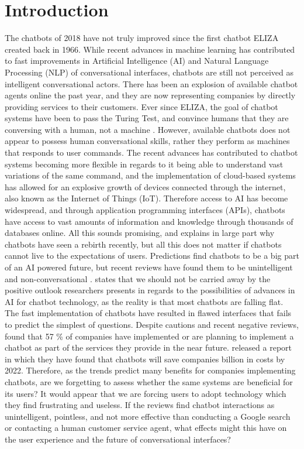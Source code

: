 \chapter{Introduction}
\label{chap:introduction}
The chatbots of 2018 have not truly improved since the first chatbot ELIZA created back in 1966. While recent advances in machine learning has contributed to fast improvements in Artificial Intelligence (AI) and Natural Language Processing (NLP) of conversational interfaces, chatbots are still not perceived as intelligent conversational actors. There has been an explosion of available chatbot agents online the past year, and they are now representing companies by directly providing services to their customers. Ever since ELIZA, the goal of chatbot systems have been to pass the Turing Test, and convince humans that they are conversing with a human, not a machine \citep{McTear2016b}. However, available chatbots does not appear to possess human conversational skills, rather they perform as machines that responds to user commands. The recent advances has contributed to chatbot systems becoming more flexible in regards to it being able to understand vast variations of the same command, and the implementation of cloud-based systems has allowed for an explosive growth of devices connected through the internet, also known as the Internet of Things (IoT). Therefore access to AI has become widespread, and through application programming interfaces (APIs), chatbots have access to vast amounts of information and knowledge through thousands of databases online. All this sounds promising, and explains in large part why chatbots have seen a rebirth recently, but all this does not matter if chatbots cannot live to the expectations of users.  Predictions find chatbots to be a big part of an AI powered future, but recent reviews have found them to be unintelligent and non-conversational \citep{stokke2017,orf2017,piltch2017,vincent2017,boutin2017}. \cite{piltch2017} states that we should not be carried away by the positive outlook researchers presents in regards to the possibilities of advances in AI for chatbot technology, as the reality is that most chatbots are falling flat. The fast implementation of chatbots have resulted in flawed interfaces that fails to predict the simplest of questions. Despite cautions and recent negative reviews, \cite{forrester2017} found that 57 \% of companies have implemented or are planning to implement a chatbot as part of the services they provide in the near future. \cite{juniper2017} released a report in which they have found that chatbots will save companies  billion in costs by 2022. Therefore, as the trends predict many benefits for companies implementing chatbots, are we forgetting to assess whether the same systems are beneficial for its users? It would appear that we are forcing users to adopt technology which they find frustrating and useless. If the reviews find chatbot interactions as unintelligent, pointless, and not more effective than conducting a Google search or contacting a human customer service agent, what effects might this have on the user experience and the future of conversational interfaces?
